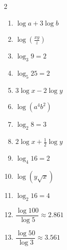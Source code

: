 \documentclass[11pt]{article}
\begin{document}
\begin{keybox}
\begin{multicols}{2}
\small
\begin{enumerate}[leftmargin=*,itemsep=3pt]
  \item $\log a+3\log b$
  \item $\log\!\left(\tfrac{xy}{z}\right)$
  \item $\log_3 9=2$
  \item $\log_5 25=2$
  \item $3\log x-2\log y$
  \item $\log(a^4b^2)$
  \item $\log_2 8=3$
  \item $2\log x+\tfrac12\log y$
  \item $\log_4 16=2$
  \item $\log(y\sqrt{x})$
  \item $\log_2 16=4$
  \item $\dfrac{\log 100}{\log 5}\approx2.861$
  \item $\dfrac{\log 50}{\log 3}\approx3.561$
\end{enumerate}
\end{multicols}
\end{keybox}
\end{document}
